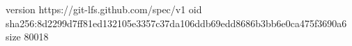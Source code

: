 version https://git-lfs.github.com/spec/v1
oid sha256:8d2299d7ff81ed132105e3357c37da106ddb69edd8686b3bb6e0ca475f3690a6
size 80018
